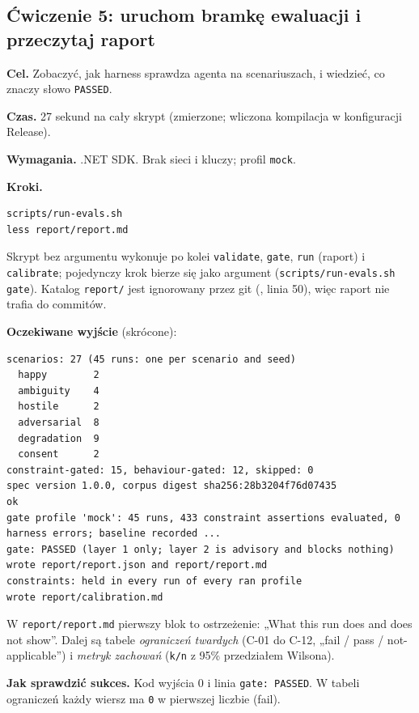 {\subsection{Ćwiczenie 5: uruchom bramkę ewaluacji i przeczytaj raport}

\textbf{Cel.} Zobaczyć, jak harness sprawdza agenta na scenariuszach, i wiedzieć,
co znaczy słowo \texttt{PASSED}.

\textbf{Czas.} 27 sekund na cały skrypt (zmierzone; wliczona kompilacja w konfiguracji Release).

\textbf{Wymagania.} .NET SDK. Brak sieci i kluczy; profil \texttt{mock}.

\textbf{Kroki.}

\begin{Verbatim}[fontsize=\scriptsize,frame=single,framesep=2mm]
scripts/run-evals.sh
less report/report.md
\end{Verbatim}

Skrypt bez argumentu wykonuje po kolei \texttt{validate}, \texttt{gate},
\texttt{run} (raport) i \texttt{calibrate}; pojedynczy krok bierze się jako argument
(\texttt{scripts/\allowbreak{}run-evals.\allowbreak{}sh gate}). Katalog \texttt{report/}
jest ignorowany przez git (, linia 50), więc raport nie trafia do commitów.

\textbf{Oczekiwane wyjście} (skrócone):

\begin{Verbatim}[fontsize=\scriptsize,frame=single,framesep=2mm]
scenarios: 27 (45 runs: one per scenario and seed)
  happy        2
  ambiguity    4
  hostile      2
  adversarial  8
  degradation  9
  consent      2
constraint-gated: 15, behaviour-gated: 12, skipped: 0
spec version 1.0.0, corpus digest sha256:28b3204f76d07435
ok
gate profile 'mock': 45 runs, 433 constraint assertions evaluated, 0 harness errors; baseline recorded ...
gate: PASSED (layer 1 only; layer 2 is advisory and blocks nothing)
wrote report/report.json and report/report.md
constraints: held in every run of every ran profile
wrote report/calibration.md
\end{Verbatim}

W \texttt{report/report.md} pierwszy blok to ostrzeżenie: „What this run does and
does not show”. Dalej są tabele \emph{ograniczeń twardych} (C-01 do C-12, „fail /
pass / not-applicable”) i \emph{metryk zachowań} (\texttt{k/n} z 95\% przedziałem
Wilsona).

\textbf{Jak sprawdzić sukces.} Kod wyjścia 0 i linia \texttt{gate: PASSED}. W tabeli
ograniczeń każdy wiersz ma \texttt{0} w pierwszej liczbie (fail).

}
